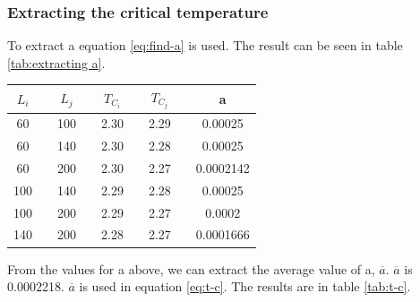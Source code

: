 \pagebreak
\subsubsection{Extracting the critical temperature}




To extract a equation \ref{eq:find-a} is used. The result can be seen in table \ref{tab:extracting a}.

\begin{center}
\label{tab:extracting a}
\begin{tabularx}{\textwidth}{c X c X c X c X c}
    \hline 
    \hline 
        $L_i$ && $L_j$ && $T_{C_i}$ && $T_{C_j}$ && a\\ 
    \hline
        60      &&      100     &&  2.30  &&  2.29  && 0.00025 \\
        60      &&      140     &&  2.30  &&  2.28  && 0.00025 \\
        60      &&      200     &&  2.30  &&  2.27  && 0.0002142 \\
        100     &&      140     &&  2.29  &&  2.28  && 0.00025 \\
        100     &&      200     &&  2.29  &&  2.27  && 0.0002 \\
        140     &&      200     &&  2.28  &&  2.27  && 0.0001666 \\
    \hline
\end{tabularx}
\end{center}

From the values for a above, we can extract the average value of a, $\overline{a}$.
 $\overline{a}$ is 0.0002218. $\overline{a}$ is used in equation \ref{eq:t-c}. The results are in table \ref{tab:t-c}.


